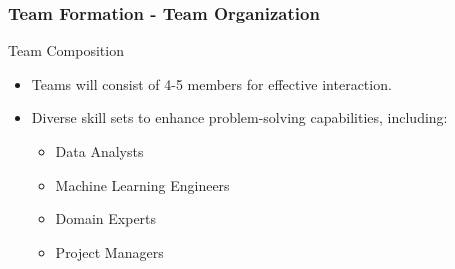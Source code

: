 \documentclass{beamer}
\begin{document}
\begin{frame}[fragile]
    \frametitle{Team Formation - Team Organization}
    \begin{block}{Team Composition}
        \begin{itemize}
            \item Teams will consist of 4-5 members for effective interaction.
            \item Diverse skill sets to enhance problem-solving capabilities, including:
            \begin{itemize}
                \item Data Analysts
                \item Machine Learning Engineers
                \item Domain Experts
                \item Project Managers
            \end{itemize}
        \end{itemize}
    \end{block}
\end{frame}
\end{document}
